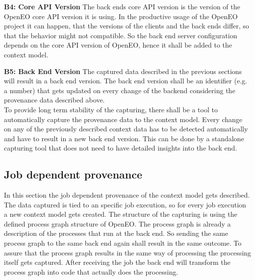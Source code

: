 \documentclass[draft,final]{vutinfth} %
\begin{document}
\textbf{B4: Core API Version}
The back ends core API version is the version of the OpenEO core API version it is using. In the productive usage of the OpenEO project it can happen, that the versions of the clients and the back ends differ, so that the behavior might not compatible. So the back end server configuration depends on the core API version of OpenEO, hence it shall be added to the context model.

\textbf{B5: Back End Version}
The captured data described in the previous sections will result in a back end version. The back end version shall be an identifier (e.g. a number) that gets updated on every change of the backend considering the provenance data described above. 
\\
To  provide long term stability of the capturing, there shall be a tool to automatically capture the provenance data to the context model. Every change on any of the previously described context data has to be detected automatically and have to result in a new back end version. This can be done by a standalone capturing tool that does not need to have detailed insights into the back end. 


\subsection{Job dependent provenance}\label{Design:Job dependent provenance}
In this section the job dependent provenance of the context model gets described. The data captured is tied to an specific job execution, so for every job execution a new context model gets created. The structure of the capturing is using the defined process graph structure of OpenEO. The process graph is already a description of the processes that run at the back end. So sending the same process graph to the same back end again shall result in the same outcome. To assure that the process graph results in the same way of processing the processing itself gets captured. After receiving the job the back end will transform the process graph into code that actually does the processing. %

\end{document}
